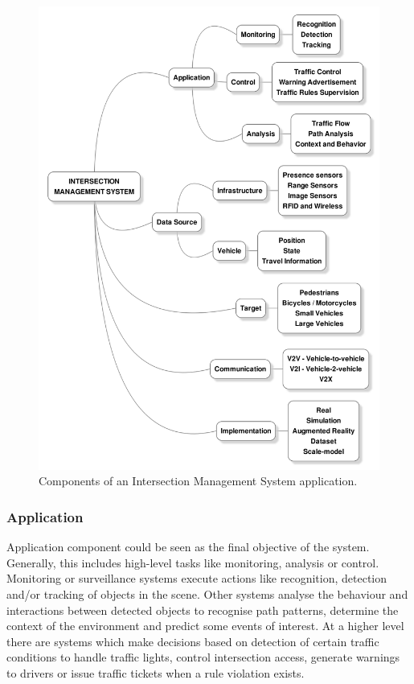 \documentclass[conference]{IEEEtran}
\begin{document}
\begin{figure}[ht!]
\centering
\includegraphics[scale=0.19]{../fig/2/ims_graph5.png}
\caption{Components of an Intersection Management System application.}
\label{imsComps}
\end{figure}

\subsubsection{Application}

Application component could be seen as the final objective of the system. Generally, this includes high-level tasks like monitoring, analysis or control. Monitoring or surveillance systems execute actions like recognition, detection and/or tracking of objects in the scene. 
Other systems analyse the behaviour and interactions between detected objects to recognise path patterns, determine the context of the environment and predict some events of interest. At a higher level there are systems which make decisions based on detection of certain traffic conditions to handle traffic lights, control intersection access, generate warnings to drivers or issue traffic tickets when a rule violation exists.
\end{document}
